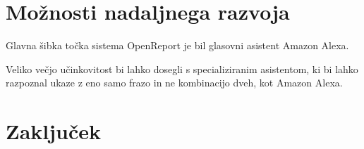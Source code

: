 \documentclass[a4paper, 12pt]{book}
\begin{document}
\chapter{Možnosti nadaljnega razvoja}

Glavna šibka točka sistema OpenReport je bil glasovni asistent Amazon Alexa.

Veliko večjo učinkovitost bi lahko dosegli s specializiranim asistentom, ki bi lahko razpoznal ukaze z eno samo frazo in ne kombinacijo dveh, kot Amazon Alexa.


\chapter{Zaključek}

% 


\newpage %
\ \\
\clearpage
{}

\end{document}
